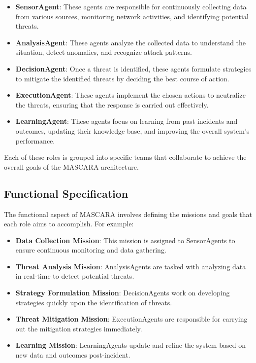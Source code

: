 \documentclass[conference]{IEEEtran}
\begin{document}
\begin{itemize}
    \item \textbf{SensorAgent}: These agents are responsible for continuously collecting data from various sources, monitoring network activities, and identifying potential threats.
    \item \textbf{AnalysisAgent}: These agents analyze the collected data to understand the situation, detect anomalies, and recognize attack patterns.
    \item \textbf{DecisionAgent}: Once a threat is identified, these agents formulate strategies to mitigate the identified threats by deciding the best course of action.
    \item \textbf{ExecutionAgent}: These agents implement the chosen actions to neutralize the threats, ensuring that the response is carried out effectively.
    \item \textbf{LearningAgent}: These agents focus on learning from past incidents and outcomes, updating their knowledge base, and improving the overall system's performance.
\end{itemize}

Each of these roles is grouped into specific teams that collaborate to achieve the overall goals of the MASCARA architecture.

\subsection*{Functional Specification}

The functional aspect of MASCARA involves defining the missions and goals that each role aims to accomplish. For example:

\begin{itemize}
    \item \textbf{Data Collection Mission}: This mission is assigned to SensorAgents to ensure continuous monitoring and data gathering.
    \item \textbf{Threat Analysis Mission}: AnalysisAgents are tasked with analyzing data in real-time to detect potential threats.
    \item \textbf{Strategy Formulation Mission}: DecisionAgents work on developing strategies quickly upon the identification of threats.
    \item \textbf{Threat Mitigation Mission}: ExecutionAgents are responsible for carrying out the mitigation strategies immediately.
    \item \textbf{Learning Mission}: LearningAgents update and refine the system based on new data and outcomes post-incident.
\end{itemize}
\end{document}

